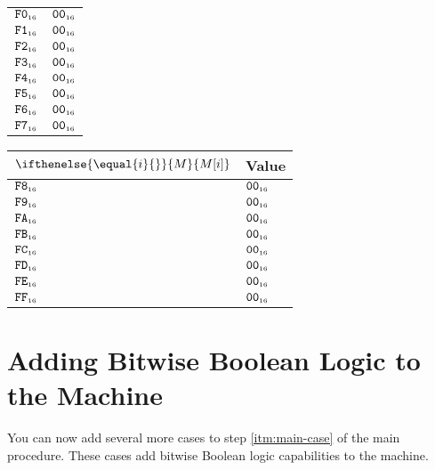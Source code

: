 \documentclass[a4paper,12pt]{article}
\newcommand{\num}[1]{\texttt{#1}}
\newcommand{\hex}[1]{\num{#1}_{\textup{\tiny 16}}}
\newcommand{\MEM}[1]{\ifthenelse{\equal{#1}{}}{M}{M[#1]}}
\begin{document}
\begin{center}
\begin{tabular}{@{}ll@{}}
    $\hex{F0}$ & $\hex{00}$ \\
    $\hex{F1}$ & $\hex{00}$ \\
    $\hex{F2}$ & $\hex{00}$ \\
    $\hex{F3}$ & $\hex{00}$ \\
    $\hex{F4}$ & $\hex{00}$ \\
    $\hex{F5}$ & $\hex{00}$ \\
    $\hex{F6}$ & $\hex{00}$ \\
    $\hex{F7}$ & $\hex{00}$ \\
    \hline
  \end{tabular}
  \hfil
  \begin{tabular}{@{}ll@{}}
    \hline
    $\MEM{i}$  & Value \\
    \hline
    $\hex{F8}$ & $\hex{00}$ \\
    $\hex{F9}$ & $\hex{00}$ \\
    $\hex{FA}$ & $\hex{00}$ \\
    $\hex{FB}$ & $\hex{00}$ \\
    $\hex{FC}$ & $\hex{00}$ \\
    $\hex{FD}$ & $\hex{00}$ \\
    $\hex{FE}$ & $\hex{00}$ \\
    $\hex{FF}$ & $\hex{00}$ \\
    \hline
  \end{tabular}
\end{center}


\section{Adding Bitwise Boolean Logic to the Machine}

You can now add several more cases to step \ref{itm:main-case} of the main procedure.
These cases add bitwise Boolean logic capabilities to the machine.
\end{document}
